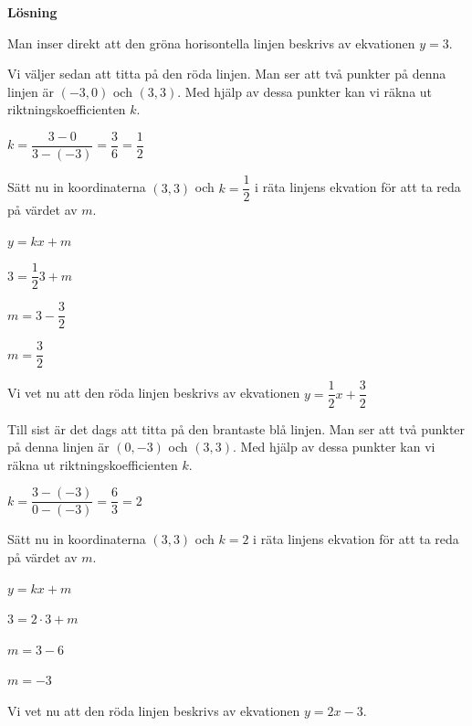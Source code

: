 \documentclass{article}
\begin{document}
\textbf{Lösning}

Man inser direkt att den gröna horisontella linjen beskrivs av ekvationen $y = 3$.

Vi väljer sedan att titta på den röda linjen. Man ser att två punkter på denna linjen är $(-3, 0)$ och $(3, 3)$. Med hjälp av dessa punkter kan vi räkna ut riktningskoefficienten $k$.

$k=\dfrac{3-0}{3-(-3)}=\dfrac{3}{6}=\dfrac{1}{2}$

Sätt nu in koordinaterna $(3, 3)$ och $k = \dfrac{1}{2}$ i räta linjens ekvation för att ta reda på värdet av $m$.

$y = kx + m$

$3 = \dfrac{1}{2}3 + m$

$m = 3 - \dfrac{3}{2}$

$m = \dfrac{3}{2}$

Vi vet nu att den röda linjen beskrivs av ekvationen $y = \dfrac{1}{2}x + \dfrac{3}{2}$

Till sist är det dags att titta på den brantaste blå linjen. Man ser att två punkter på denna linjen är $(0, -3)$ och $(3, 3)$. Med hjälp av dessa punkter kan vi räkna ut riktningskoefficienten $k$.

$k=\dfrac{3-(-3)}{0-(-3)}=\dfrac{6}{3}=2$

Sätt nu in koordinaterna $(3, 3)$ och $k = 2$ i räta linjens ekvation för att ta reda på värdet av $m$.

$y = kx + m$

$3 = 2\cdot3 + m$

$m = 3 - 6$

$m = -3$

Vi vet nu att den röda linjen beskrivs av ekvationen $y = 2x - 3$.
\end{document}
